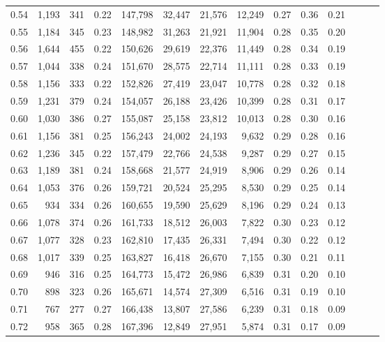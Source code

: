 \begin{tabular}{rrrrrrrrrrrrrr}
0.54 &  1,193 &  341 &  0.22 &  147,798 &   32,447 &  21,576 &  12,249 &  0.27 &  0.36 &      0.21 \\
0.55 &  1,184 &  345 &  0.23 &  148,982 &   31,263 &  21,921 &  11,904 &  0.28 &  0.35 &      0.20 \\
0.56 &  1,644 &  455 &  0.22 &  150,626 &   29,619 &  22,376 &  11,449 &  0.28 &  0.34 &      0.19 \\
0.57 &  1,044 &  338 &  0.24 &  151,670 &   28,575 &  22,714 &  11,111 &  0.28 &  0.33 &      0.19 \\
0.58 &  1,156 &  333 &  0.22 &  152,826 &   27,419 &  23,047 &  10,778 &  0.28 &  0.32 &      0.18 \\
0.59 &  1,231 &  379 &  0.24 &  154,057 &   26,188 &  23,426 &  10,399 &  0.28 &  0.31 &      0.17 \\
0.60 &  1,030 &  386 &  0.27 &  155,087 &   25,158 &  23,812 &  10,013 &  0.28 &  0.30 &      0.16 \\
0.61 &  1,156 &  381 &  0.25 &  156,243 &   24,002 &  24,193 &   9,632 &  0.29 &  0.28 &      0.16 \\
0.62 &  1,236 &  345 &  0.22 &  157,479 &   22,766 &  24,538 &   9,287 &  0.29 &  0.27 &      0.15 \\
0.63 &  1,189 &  381 &  0.24 &  158,668 &   21,577 &  24,919 &   8,906 &  0.29 &  0.26 &      0.14 \\
0.64 &  1,053 &  376 &  0.26 &  159,721 &   20,524 &  25,295 &   8,530 &  0.29 &  0.25 &      0.14 \\
0.65 &    934 &  334 &  0.26 &  160,655 &   19,590 &  25,629 &   8,196 &  0.29 &  0.24 &      0.13 \\
0.66 &  1,078 &  374 &  0.26 &  161,733 &   18,512 &  26,003 &   7,822 &  0.30 &  0.23 &      0.12 \\
0.67 &  1,077 &  328 &  0.23 &  162,810 &   17,435 &  26,331 &   7,494 &  0.30 &  0.22 &      0.12 \\
0.68 &  1,017 &  339 &  0.25 &  163,827 &   16,418 &  26,670 &   7,155 &  0.30 &  0.21 &      0.11 \\
0.69 &    946 &  316 &  0.25 &  164,773 &   15,472 &  26,986 &   6,839 &  0.31 &  0.20 &      0.10 \\
0.70 &    898 &  323 &  0.26 &  165,671 &   14,574 &  27,309 &   6,516 &  0.31 &  0.19 &      0.10 \\
0.71 &    767 &  277 &  0.27 &  166,438 &   13,807 &  27,586 &   6,239 &  0.31 &  0.18 &      0.09 \\
0.72 &    958 &  365 &  0.28 &  167,396 &   12,849 &  27,951 &   5,874 &  0.31 &  0.17 &      0.09 \\

\end{tabular}
